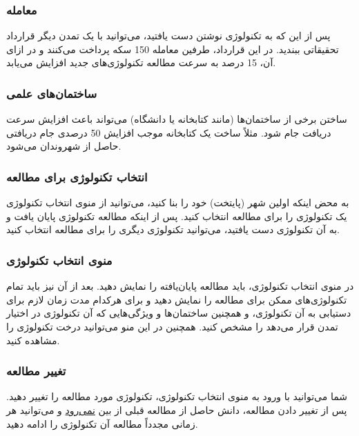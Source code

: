 \documentclass[]{article}
\begin{document}
\subsubsection*{{\titr معامله}}
پس از این که به تکنولوژی نوشتن دست یافتید، می‌توانید با یک تمدن دیگر قرارداد تحقیقاتی ببندید. در این قرارداد، طرفین معامله 150 سکه پرداخت می‌کنند و در ازای آن، 15 درصد به سرعت مطالعه تکنولوژی‌های جدید افزایش می‌یابد.

\subsubsection*{{\titr ساختمان‌های علمی}}
ساختن برخی از ساختمان‌ها (مانند کتابخانه یا دانشگاه) می‌تواند باعث افزایش سرعت دریافت جام شود. مثلاً ساخت یک کتابخانه موجب افزایش 50 درصدی جام دریافتی حاصل از شهروندان می‌شود.

\subsubsection*{{\titr انتخاب تکنولوژی برای مطالعه}}
به محض اینکه اولین شهر (پایتخت) خود را بنا کنید، می‌توانید از منوی انتخاب تکنولوژی یک تکنولوژی را برای مطالعه انتخاب کنید. پس از اینکه مطالعه تکنولوژی پایان یافت و به آن تکنولوژی دست یافتید، می‌توانید تکنولوژی دیگری را برای مطالعه انتخاب کنید.

\subsubsection*{{\titr منوی انتخاب تکنولوژی}}
در منوی انتخاب تکنولوژی، باید مطالعه پایان‌یافته را نمایش دهید. بعد از آن نیز باید تمام تکنولوژی‌های ممکن برای مطالعه را نمایش دهید و برای هرکدام مدت زمان لازم برای دستیابی به آن تکنولوژی، و همچنین ساختمان‌ها و ویژگی‌هایی که آن تکنولوژی در اختیار تمدن قرار می‌دهد را مشخص کنید. همچنین در این منو می‌توانید درخت تکنولوژی را مشاهده کنید.

\subsubsection*{{\titr تغییر مطالعه}}
شما می‌توانید با ورود به منوی انتخاب تکنولوژی، تکنولوژی مورد مطالعه را تغییر دهید. پس از تغییر دادن مطالعه، دانش حاصل از مطالعه قبلی از بین \underline{نمی‌رود} و می‌توانید هر زمانی مجدداً مطالعه آن تکنولوژی را ادامه دهید.
\end{document}
